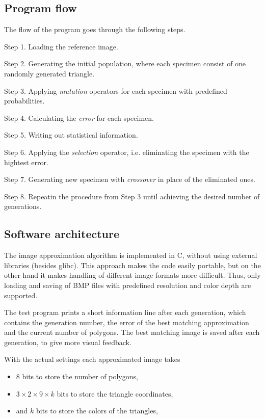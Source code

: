 \documentclass[conference]{IEEEtran}
\begin{document}
\subsection{Program flow}

The flow of the program goes through the following steps.

Step 1. Loading the reference image.

Step 2. Generating the initial population, where each specimen
consist of one randomly generated triangle.

Step 3. Applying \emph{mutation} operators for each specimen
with predefined probabilities.

Step 4. Calculating the \emph{error} for each specimen.

Step 5. Writing out statistical information.

Step 6. Applying the \emph{selection} operator, i.e.
eliminating the specimen with the hightest error.

Step 7. Generating new specimen with \emph{crossover}
in place of the eliminated ones.

Step 8. Repeatin the procedure from Step 3 until achieving
the desired number of generations.

\subsection{Software architecture}

The image approximation algorithm is implemented in C,
without using external libraries (besides glibc). This
approach makes the code easily portable, but on the other
hand it makes handling of different image formats more
difficult. Thus, only loading and saving of BMP files
with predefined resolution and color depth are supported.

The test program prints a short information line after
each generation, which contains the generation number,
the error of the best matching approximation and the
current number of polygons. The best matching image is
saved after each generation, to give more visual feedback.

With the actual settings each approximated image takes

\begin{itemize}

\item{8 bits to store the number of polygons,}

\item{$3 \times 2 \times 9 \times k$ bits to store the triangle
coordinates,}

\item{and $k$ bits to store the colors of the triangles,}

\end{itemize}
\end{document}
